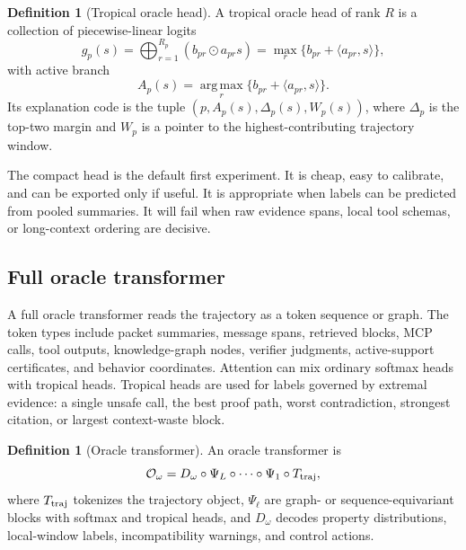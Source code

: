 \documentclass[11pt]{article}
\theoremstyle{definition}
\newtheorem{definition}[theorem]{Definition}
\theoremstyle{remark}
\newcommand{\argmax}{\operatorname*{arg\,max}}
\newcommand{\odotT}{\odot}
\numberwithin{equation}{section}
\begin{document}
\begin{definition}[Tropical oracle head]
A tropical oracle head of rank \(R\) is a collection of piecewise-linear logits
\begin{equation}
    g_p(s)=\bigoplus_{r=1}^{R_p}\left(b_{pr}\odotT a_{pr}s\right)=\max_r\{b_{pr}+\langle a_{pr},s\rangle\},
\end{equation}
with active branch
\begin{equation}
    A_p(s)=\argmax_r\{b_{pr}+\langle a_{pr},s\rangle\}.
\end{equation}
Its explanation code is the tuple \((p,A_p(s),\Delta_p(s),W_p(s))\), where \(\Delta_p\) is the top-two margin and \(W_p\) is a pointer to the highest-contributing trajectory window.
\end{definition}

The compact head is the default first experiment.  It is cheap, easy to calibrate, and can be exported only if useful.  It is appropriate when labels can be predicted from pooled summaries.  It will fail when raw evidence spans, local tool schemas, or long-context ordering are decisive.

\subsection{Full oracle transformer}

A full oracle transformer reads the trajectory as a token sequence or graph.  The token types include packet summaries, message spans, retrieved blocks, MCP calls, tool outputs, knowledge-graph nodes, verifier judgments, active-support certificates, and behavior coordinates.  Attention can mix ordinary softmax heads with tropical heads.  Tropical heads are used for labels governed by extremal evidence: a single unsafe call, the best proof path, worst contradiction, strongest citation, or largest context-waste block.

\begin{definition}[Oracle transformer]
An oracle transformer is
\begin{equation}
    \mathcal O_\omega = D_\omega\circ \Psi_L\circ\cdots\circ \Psi_1\circ T_{\rm traj},
\end{equation}
where \(T_{\rm traj}\) tokenizes the trajectory object, \(\Psi_\ell\) are graph- or sequence-equivariant blocks with softmax and tropical heads, and \(D_\omega\) decodes property distributions, local-window labels, incompatibility warnings, and control actions.
\end{definition}
\end{document}
